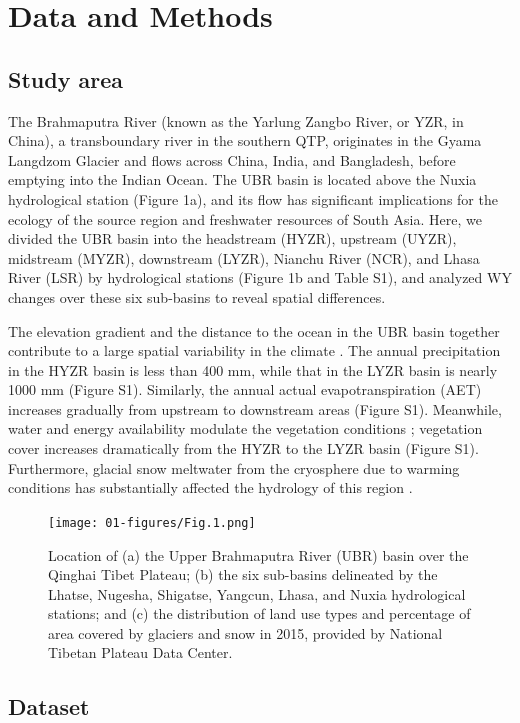 \documentclass[hess, manuscript]{copernicus}
\begin{document}
\section{Data and Methods}
\subsection{Study area}
The Brahmaputra River (known as the Yarlung Zangbo River, or YZR, in China), a transboundary river in the southern QTP, originates in the Gyama Langdzom Glacier and flows across China, India, and Bangladesh, before emptying into the Indian Ocean. The UBR basin is located above the Nuxia hydrological station (Figure 1a), and its flow has significant implications for the ecology of the source region and freshwater resources of South Asia. Here, we divided the UBR basin into the headstream (HYZR), upstream (UYZR), midstream (MYZR), downstream (LYZR), Nianchu River (NCR), and Lhasa River (LSR) by hydrological stations (Figure 1b and Table S1), and analyzed WY changes over these six sub-basins to reveal spatial differences.

The elevation gradient and the distance to the ocean in the UBR basin together contribute to a large spatial variability in the climate \citep{sang2016precipitation,wang2020integration,wang2021vanishing}. The annual precipitation in the HYZR basin is less than 400 mm, while that in the LYZR basin is nearly 1000 mm (Figure S1). Similarly, the annual actual evapotranspiration (AET) increases gradually from upstream to downstream areas (Figure S1). Meanwhile, water and energy availability modulate the vegetation conditions \citep{li2019greening}; vegetation cover increases dramatically from the HYZR to the LYZR basin (Figure S1). Furthermore, glacial snow meltwater from the cryosphere due to warming conditions has substantially affected the hydrology of this region \citep{cuo2019warming,yao2010glacial,wang2021tp}.

\begin{figure}[t]
\texttt{[image: 01-figures/Fig.1.png]}
\caption{Location of (a) the Upper Brahmaputra River (UBR) basin over the Qinghai Tibet Plateau; (b) the six sub-basins delineated by
the Lhatse, Nugesha, Shigatse, Yangcun, Lhasa, and Nuxia hydrological stations; and (c) the distribution of land use types and percentage
of area covered by glaciers and snow in 2015, provided by National Tibetan Plateau Data Center.}
\label{fig:location}
\end{figure}

\subsection{Dataset}
\end{document}
